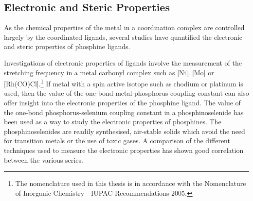 \subsection{Electronic and Steric Properties}

As the chemical properties of the metal in a coordination complex are controlled largely by the coordinated ligands, several studies have quantified the electronic and steric properties of phosphine ligands.\cite{Tolman1977, Banger2009, Dunne1991, Roodt2003, Mann1980, Tiburcio2006, Tolman1970}  

Investigations of electronic properties of ligands involve the measurement of the  stretching frequency in a metal carbonyl complex such as [Ni], [Mo] or [Rh(CO)Cl].\footnote{The nomenclature used in this thesis is in accordance with the Nomenclature of Inorganic Chemistry - IUPAC Recommendations 2005.\cite{IUPAC2005}}\cite{Tolman1977, Tolman1970, Roodt2003, Banger2009}  If metal with a spin active isotope such as rhodium or platinum is used, then the value of the one-bond metal-phosphorus coupling constant can also offer insight into the electronic properties of the phosphine ligand.\cite{Mann1980, Pregosin2012, Roodt2003, Banger2009}  The value of the one-bond phosphorus-selenium coupling constant in a phosphinoselenide has been used as a way to study the electronic properties of phosphines.\cite{Beckmann2011, Allman1982}  The phosphinoselenides are readily synthesised, air-stable solids which avoid the need for transition metals or the use of toxic gases.  A comparison of the different techniques used to measure the electronic properties has shown good correlation between the various series.\cite{Banger2009}



